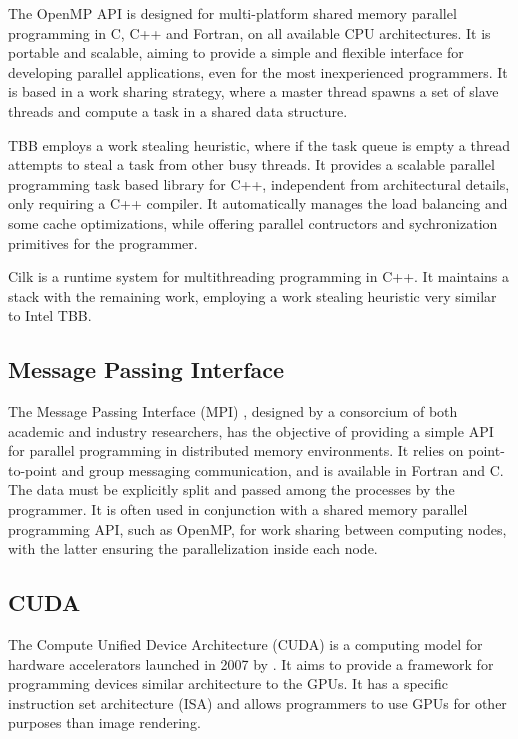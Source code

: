 The OpenMP API is designed for multi-platform shared memory parallel programming in C, C++ and Fortran, on all available CPU architectures. It is portable and scalable, aiming to provide a simple and flexible interface for developing parallel applications, even for the most inexperienced programmers. It is based in a work sharing strategy, where a master thread spawns a set of slave threads and compute a task in a shared data structure.

\intel TBB employs a work stealing heuristic, where if the task queue is empty a thread attempts to steal a task from other busy threads. It provides a scalable parallel programming task based library for C++, independent from architectural details, only requiring a C++ compiler. It automatically manages the load balancing and some cache optimizations, while offering parallel contructors and sychronization primitives for the programmer.

Cilk is a runtime system for multithreading programming in C++. It maintains a stack with the remaining work, employing a work stealing heuristic very similar to Intel TBB.

\subsection{Message Passing Interface}
\label{MPI}

The Message Passing Interface (MPI) \cite{MPI}, designed by a consorcium of both academic and industry researchers, has the objective of providing a simple API for parallel programming in distributed memory environments. It relies on point-to-point and group messaging communication, and is available in Fortran and C. The data must be explicitly split and passed among the processes by the programmer. It is often used in conjunction with a shared memory parallel programming API, such as OpenMP, for work sharing between computing nodes, with the latter ensuring the parallelization inside each node.

\subsection{CUDA}
\label{CUDA}

The Compute Unified Device Architecture (CUDA) is a computing model for hardware accelerators launched in 2007 by \nvidia. It aims to provide a framework for programming devices similar architecture to the \nvidia GPUs. It has a specific instruction set architecture (ISA) and allows programmers to use GPUs for other purposes than image rendering.

